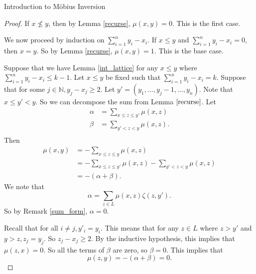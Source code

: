 \documentclass[12pt]{pom_thesis}
\newcommand{\Nn}{\mathbb{N}}
\begin{document}
\begin{chapter}{Introduction to M\"obius Inversion}
\begin{proof}
If $x \nleq y$, then by Lemma \ref{recurse}, $\mu(x,y) = 0$. This is the first case.

We now proceed by induction on $\sum_{i=1}^ny_i-x_i$. If $x \leq y$ and $\sum_{i=1}^ny_i-x_i = 0$, then $x = y$. So by Lemma \ref{recurse}, $\mu(x,y) = 1$. This is the base case.

Suppose that we have Lemma \ref{int_lattice} for any $x \leq y$ where $\sum_{i=1}^ny_i-x_i \leq k-1$. Let $x \leq y$ be fixed such that $\sum_{i=1}^ny_i-x_i =k$. Suppose that for some $j \in \Nn, y_j-x_j \geq 2$. Let $y' = (y_1,\dots,y_j-1,\dots,y_n)$. Note that $x \leq y' < y$. So we can decompose the sum from Lemma $\ref{recurse}$. Let
\begin{align*}
\alpha &= \sum_{x \leq z \leq y'} \mu(x,z)\\
\beta &= \sum_{y' < z < y}\mu(x,z).\\
\end{align*}
Then
\begin{align*}
\mu(x,y) &= -\sum_{x \leq z \leq y}\mu(x,z)\\
&= -\sum_{x \leq z \leq y'} \mu(x,z) - \sum_{y' < z < y}\mu(x,z)\\
&= -(\alpha + \beta).
\end{align*}
We note that
\[\alpha = \sum_{z \in L} \mu(x,z)\zeta(z,y').
\]
So by Remark \ref{sum_form}, $\alpha=0$. 

Recall that for all $i \neq j, y'_i = y_i$. This means that for any $z \in L$ where $z>y'$ and $y > z, z_j = y_j$. So $z_j-x_j \geq 2$. By the inductive hypothesis, this implies that $\mu(z,x)=0$. So all the terms of $\beta$ are zero, so $\beta=0$. This implies that \[\mu(z,y)=-(\alpha+\beta)=0.\]


\end{proof}
\end{chapter}
\end{document}

